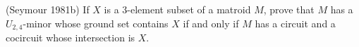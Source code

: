 \prob
{
    (Seymour 1981b) If $X$ is a 3-element subset of a matroid $M$, prove that $M$ has a $U_{2,4}$-minor whose ground set
    contains $X$ if and only if $M$ has a circuit and a cocircuit whose intersection is $X$.
}